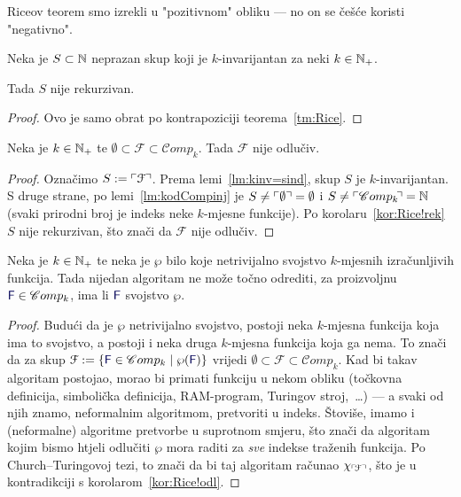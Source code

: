 Riceov teorem smo izrekli u "pozitivnom" obliku --- no on se češće koristi "negativno".

\begin{korolar}[{name=[nerekurzivnost netrivijalnog $k$-invarijantnog skupa brojeva]}]\label{kor:Rice!rek}
Neka je $S\subset{\mathbb N}$ neprazan skup koji je $k$-invarijantan za neki $k\in{\mathbb N}_+$.
	
	Tada $S$ nije rekurzivan.
\end{korolar}
\begin{proof}
Ovo je samo obrat po kontrapoziciji teorema~\ref{tm:Rice}.
\end{proof}

\begin{korolar}[{name=[neodlučivost netrivijalnog skupa izračunljivih funkcija]}]\label{kor:Rice!odl}
Neka je $k\in{\mathbb N}_+$ te $\emptyset\subset\mathcal F\subset\mathscr Comp_k$. Tada $\mathcal F$ nije odlučiv.
\end{korolar}
\begin{proof}
    Označimo $S:=\ulcorner\mathcal F\urcorner$. Prema lemi~\ref{lm:kinv=sind}, skup $S$ je $k$-invarijantan. S druge strane, po lemi~\ref{lm:kodCompinj} je $S\ne\ulcorner\emptyset\urcorner=\emptyset$ i $S\ne\ulcorner\mathscr Comp_k\!\urcorner={\mathbb N}$ (svaki prirodni broj je indeks neke $k$-mjesne funkcije). Po korolaru~\ref{kor:Rice!rek} $S$ nije rekurzivan, što znači da $\mathcal F$ nije odlučiv.
\end{proof}

\begin{korolar}[{name=[neodlučivost netrivijalnih semantičkih svojstava]}]
Neka je $k\in{\mathbb N}_+$ te neka je $\wp$ bilo koje netrivijalno svojstvo $k$-mjesnih izračunljivih funkcija. Tada nijedan algoritam ne može točno odrediti, za proizvoljnu $\f F\in\mathscr Comp_k$, ima li $\f F$ svojstvo $\wp$.
\end{korolar}
\begin{proof}
Budući da je $\wp$ netrivijalno svojstvo, postoji neka $k$-mjesna funkcija koja ima to svojstvo, a postoji i neka druga $k$-mjesna funkcija koja ga nema. To znači da za skup $\mathcal F:=\{\f F\in\mathscr Comp_k\mid\wp(\f F)\}$ vrijedi $\emptyset\subset\mathcal F\subset\mathscr Comp_k$. Kad bi takav algoritam postojao, morao bi primati funkciju u nekom obliku (točkovna definicija, simbolička definicija, RAM-program, Turingov stroj,~\ldots) --- a svaki od njih znamo, neformalnim algoritmom, pretvoriti u indeks. Štoviše, imamo i (neformalne) algoritme pretvorbe u suprotnom smjeru, što znači da algoritam kojim bismo htjeli odlučiti $\wp$ mora raditi za \emph{sve} indekse traženih funkcija.
Po Church--\!Turingovoj tezi, to znači da bi taj algoritam računao $\chi_{\ulcorner\!\mathcal F\urcorner}$, što je u kontradikciji s korolarom~\ref{kor:Rice!odl}.
\end{proof}

